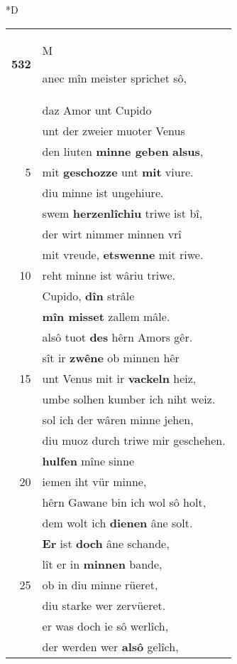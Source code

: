 \documentclass[8pt,a4paper,notitlepage]{article}
\begin{document}
\begin{table}[ht]
\begin{minipage}[t]{0.5\linewidth}
\small
\begin{center}*D
\end{center}
\begin{tabular}{rl}
\textbf{532} & \begin{large}M\end{large}anec mîn meister sprichet sô,\\ 
 & daz Amor unt Cupido\\ 
 & unt der zweier muoter Venus\\ 
 & den liuten \textbf{minne geben} \textbf{alsus},\\ 
5 & mit \textbf{geschozze} unt \textbf{mit} viure.\\ 
 & diu minne ist ungehiure.\\ 
 & swem \textbf{herzenlîchiu} triwe ist bî,\\ 
 & der wirt nimmer minnen vrî\\ 
 & mit vreude, \textbf{etswenne} mit riwe.\\ 
10 & reht minne ist wâriu triwe.\\ 
 & Cupido, \textbf{dîn} strâle\\ 
 & \textbf{mîn misset} zallem mâle.\\ 
 & alsô tuot \textbf{des} hêrn Amors gêr.\\ 
 & sît ir \textbf{zwêne} ob minnen hêr\\ 
15 & unt Venus mit ir \textbf{vackeln} heiz,\\ 
 & umbe solhen kumber ich niht weiz.\\ 
 & sol ich der wâren minne jehen,\\ 
 & diu muoz durch triwe mir geschehen.\\ 
 & \textbf{hulfen} mîne sinne\\ 
20 & iemen iht vür minne,\\ 
 & hêrn Gawane bin ich wol sô holt,\\ 
 & dem wolt ich \textbf{dienen} âne solt.\\ 
 & \textbf{Er} ist \textbf{doch} âne schande,\\ 
 & lît er in \textbf{minnen} bande,\\ 
25 & ob in diu minne rüeret,\\ 
 & diu starke wer zervüeret.\\ 
 & er was doch ie sô werlîch,\\ 
 & der werden wer \textbf{alsô} gelîch,\\ 

\end{tabular}
\end{minipage}
\end{table}
\end{document}
